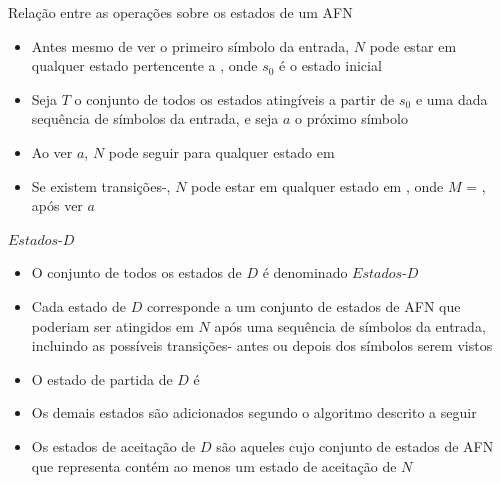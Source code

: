 \begin{frame}[fragile]{Relação entre as operações sobre os estados de um AFN}

    \begin{itemize}
        \item Antes mesmo de ver o primeiro símbolo da entrada, $N$ pode estar em qualquer estado pertencente a , onde $s_0$
            é o estado inicial
        \pause

        \item Seja $T$ o conjunto de todos os estados atingíveis a partir de $s_0$ e uma dada sequência de símbolos da entrada, e seja $a$ o próximo símbolo
        \pause

        \item Ao ver $a$, $N$ pode seguir para qualquer estado em 
        \pause

        \item Se existem transições-, $N$ pode estar em qualquer estado em , onde $M$ = , após ver $a$

    \end{itemize}

\end{frame}

\begin{frame}[fragile]{$Estados$-$D$}

    \begin{itemize}
        \item O conjunto de todos os estados de $D$ é denominado $Estados$-$D$
        \pause

        \item Cada estado de $D$ corresponde a um conjunto de estados de AFN que poderiam ser atingidos em $N$ após uma sequência de símbolos da entrada, incluindo
            as possíveis transições- antes ou depois dos símbolos serem vistos
        \pause

        \item O estado de partida de $D$ é 
        \pause

        \item Os demais estados são adicionados segundo o algoritmo descrito a seguir
        \pause

        \item Os estados de aceitação de $D$ são aqueles cujo conjunto de estados de AFN que representa contém ao menos um estado de aceitação de $N$
    \end{itemize}

\end{frame}

